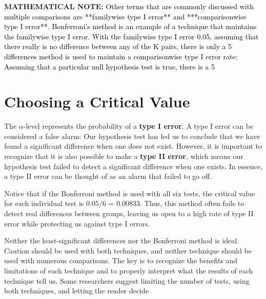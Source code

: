 \documentclass[
]{report}
\begin{document}
\large

\textbf{MATHEMATICAL NOTE:}
\textcolor{black}{Other terms that are commonly discussed with multiple comparisons are **familywise type I error** and
***comparisonwise type I error**. Bonferroni’s method is an example of a technique that maintains the familywise type I error. With the familywise type I error 0.05, assuming that there really is no difference between any of the K pairs, there is only a 5%
differences method is used to maintain a comparisonwise type I error rate: Assuming that a particular null hypothesis test is true, there is a 5%
}

\normalsize

\section*{\texorpdfstring{\textbf{Choosing a Critical Value}}{Choosing a Critical Value}}\label{choosing-a-critical-value}

The \(\alpha\)-level represents the probability of a \textbf{type I error}. A type I error can be considered a false alarm: Our hypothesis test has led us to conclude that we have found a significant difference when one does not exist. However, it is important to recognize that it is also possible to make a \textbf{type II error}, which means our hypothesis
test failed to detect a significant difference when one exists. In essence, a type II error can be thought of as an alarm that failed to go off.

Notice that if the Bonferroni method is used with all six tests, the critical value for each individual test is 0.05/6 = 0.00833. Thus, this method often fails to detect real differences between groups, leaving us open to a high rate of type II error while protecting us against type I errors.

Neither the least-significant differences nor the Bonferroni method is ideal. Caution should be used with both techniques, and neither technique should be used with numerous comparisons. The key is to recognize the benefits and limitations of each technique and to properly interpret what the results of each technique tell us. Some researchers suggest limiting the number of tests, using both techniques, and letting the reader decide
\end{document}
